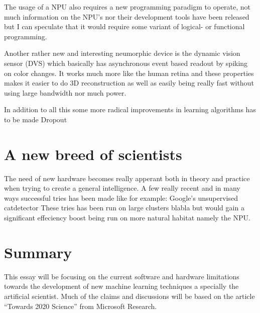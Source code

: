\documentclass{article}
\begin{document}
    The usage of a NPU also requires a new programming paradigm to
    operate, not much information on the NPU's nor their development tools
    have been released but I can speculate that it would require some variant of
    logical- or functional programming.
    
    Another rather new and interesting neumorphic device is the
    dynamic vision sensor (DVS) which basically has asynchronous event based
    readout by spiking on color changes.\cite{dvs} It works much more like the human retina and
    these properties makes it easier to do 3D reconstruction as well as easily
    being really fast without using large bandwidth nor much power.

    In addition to all this some more radical improvements in learning
    algorithms has to be made
    Dropout \cite{dropout}

\section{A new breed of scientists}
    The need of new hardware becomes really apperant both in
    theory and practice when trying to create a general intelligence.
    A few really recent and in many ways successful tries has been made
    like for example: Google's unsupervised catdetector %
    These tries has been run on large clusters blabla but would gain a
    significant effeciency boost being run on more natural habitat namely the
    NPU. 

\section{Summary} %

    This essay will be focusing on the current software and hardware limitations
    towards the development of new machine learning techniques a specially the
    artificial scientist. Much of the claims and discussions will be based on
    the article ``Towards 2020 Science'' from Microsoft Research.\cite{ms2020}

\end{document}
